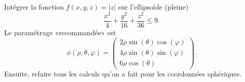 
\begin{exercice}\label{exoOutilsMath-0113}

    Intégrer la fonction $f(x,y,z)=| z |$ sur l'ellipsoïde (pleine)
    \begin{equation}
        \frac{ x^2 }{ 4 }+\frac{ y^2 }{ 16 }+\frac{ z^2 }{ 36 }\leq 9.
    \end{equation}
    Le paramétrage «recommandée» est
    \begin{equation}
        \phi(\rho,\theta,\varphi)=\begin{pmatrix}
            2\rho\sin(\theta)\cos(\varphi)    \\ 
            4\rho\sin(\theta)\sin(\varphi)    \\ 
            6\rho\cos(\theta)    
        \end{pmatrix}.
    \end{equation}
    Ensuite, refaire tous les calculs qu'on a fait pour les coordonnées sphériques.

\end{exercice}
